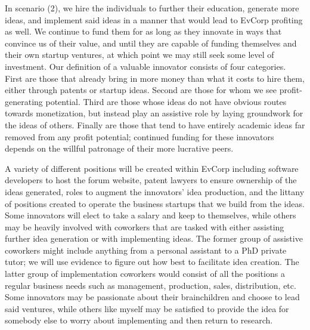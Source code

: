 \documentclass{article}[10pt]
\begin{document}
In scenario (2), we hire the individuals to further their education, generate more ideas, and implement said ideas in a manner that would lead to EvCorp profiting as well. 
We continue to fund them for as long as they innovate in ways that convince us of their value, and until they are capable of funding themselves and their own startup ventures, at which point we may still seek some level of investment. 
Our definition of a valuable innovator consists of four categories. 
First are those that already bring in more money than what it costs to hire them, either through patents or startup ideas. 
Second are those for whom we see profit-generating potential.
Third are those whose ideas do not have obvious routes towards monetization, but instead play an assistive role by laying groundwork for the ideas of others.
Finally are those that tend to have entirely academic ideas far removed from any profit potential; continued funding for these innovators depends on the willful patronage of their more lucrative peers. \par 

A variety of different positions will be created within EvCorp including software developers to host the forum website, patent lawyers to ensure ownership of the ideas generated, roles to augment the innovators' idea production, and the littany of positions created to operate the business startups that we build from the ideas. 
Some innovators will elect to take a salary and keep to themselves, while others may be heavily involved with coworkers that are tasked with either assisting further idea generation or with implementing ideas.
The former group of assistive coworkers might include anything from a personal assistant to a PhD private tutor; we will use evidence to figure out how best to facilitate idea creation.
The latter group of implementation coworkers would consist of all the positions a regular business needs such as management, production, sales, distribution, etc.
Some innovators may be passionate about their brainchildren and choose to lead said ventures, while others like myself may be satisfied to provide the idea for somebody else to worry about implementing and then return to research.\par
\end{document}
